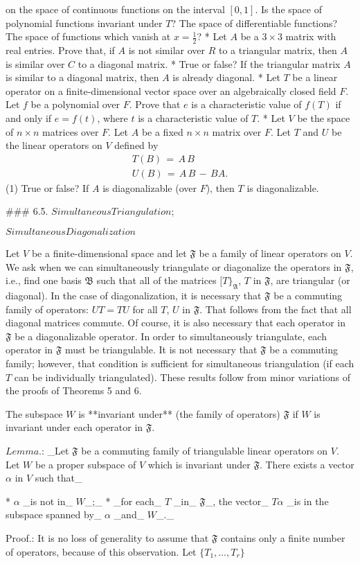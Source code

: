 on the space of continuous functions on the interval \([0,1]\). Is the space of polynomial functions invariant under \(T\)? The space of differentiable functions? The space of functions which vanish at \(x=\frac{1}{2}\)?
* Let \(A\) be a \(3\times 3\) matrix with real entries. Prove that, if \(A\) is not similar over \(R\) to a triangular matrix, then \(A\) is similar over \(C\) to a diagonal matrix.
* True or false? If the triangular matrix \(A\) is similar to a diagonal matrix, then \(A\) is already diagonal.
* Let \(T\) be a linear operator on a finite-dimensional vector space over an algebraically closed field \(F\). Let \(f\) be a polynomial over \(F\). Prove that \(e\) is a characteristic value of \(f(T)\) if and only if \(e=f(t)\), where \(t\) is a characteristic value of \(T\).
* Let \(V\) be the space of \(n\times n\) matrices over \(F\). Let \(A\) be a fixed \(n\times n\) matrix over \(F\). Let \(T\) and \(U\) be the linear operators on \(V\) defined by \[\begin{array}{l}T(B)\,=\,A\,B\\ U(B)\,=\,A\,B\,-\,BA.\end{array}\] (1) True or false? If \(A\) is diagonalizable (over \(F\)), then \(T\) is diagonalizable.

### 6.5. \(Simultaneous\)\(Triangulation\);

\(Simultaneous\)\(Diagonalization\)

Let \(V\) be a finite-dimensional space and let \(\mathfrak{F}\) be a family of linear operators on \(V\). We ask when we can simultaneously triangulate or diagonalize the operators in \(\mathfrak{F}\), i.e., find one basis \(\mathfrak{B}\) such that all of the matrices \([T\}_{\mathfrak{A}}\), \(T\) in \(\mathfrak{F}\), are triangular (or diagonal). In the case of diagonalization, it is necessary that \(\mathfrak{F}\) be a commuting family of operators: \(UT=TU\) for all \(T\), \(U\) in \(\mathfrak{F}\). That follows from the fact that all diagonal matrices commute. Of course, it is also necessary that each operator in \(\mathfrak{F}\) be a diagonalizable operator. In order to simultaneously triangulate, each operator in \(\mathfrak{F}\) must be triangulable. It is not necessary that \(\mathfrak{F}\) be a commuting family; however, that condition is sufficient for simultaneous triangulation (if each \(T\) can be individually triangulated). These results follow from minor variations of the proofs of Theorems 5 and 6.

The subspace \(W\) is **invariant under** (the family of operators) \(\mathfrak{F}\) if \(W\) is invariant under each operator in \(\mathfrak{F}\).

\(Lemma\).: _Let \(\mathfrak{F}\) be a commuting family of triangulable linear operators on \(V\). Let \(W\) be a proper subspace of \(V\) which is invariant under \(\mathfrak{F}\). There exists a vector \(\alpha\) in \(V\) such that_

* \(\alpha\) _is not in_ \(W\)_;_
* _for each_ \(T\) _in_ \(\mathfrak{F}\)_, the vector_ \(T\alpha\) _is in the subspace spanned by_ \(\alpha\) _and_ \(W\)_._

Proof.: It is no loss of generality to assume that \(\mathfrak{F}\) contains only a finite number of operators, because of this observation. Let \(\{T_{1},\ldots,T_{r}\}\) 